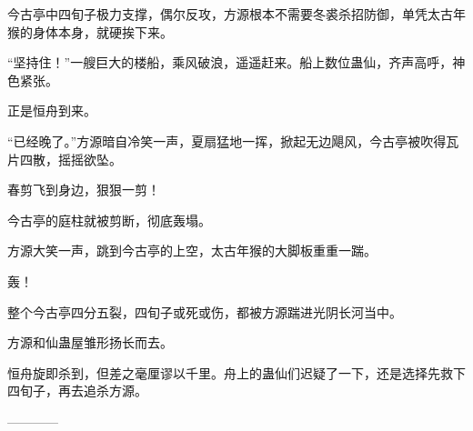 \begin{this_body}
今古亭中四旬子极力支撑，偶尔反攻，方源根本不需要冬裘杀招防御，单凭太古年猴的身体本身，就硬挨下来。

“坚持住！”一艘巨大的楼船，乘风破浪，遥遥赶来。船上数位蛊仙，齐声高呼，神色紧张。

正是恒舟到来。

“已经晚了。”方源暗自冷笑一声，夏扇猛地一挥，掀起无边飓风，今古亭被吹得瓦片四散，摇摇欲坠。

春剪飞到身边，狠狠一剪！

今古亭的庭柱就被剪断，彻底轰塌。

方源大笑一声，跳到今古亭的上空，太古年猴的大脚板重重一踹。

轰！

整个今古亭四分五裂，四旬子或死或伤，都被方源踹进光阴长河当中。

方源和仙蛊屋雏形扬长而去。

恒舟旋即杀到，但差之毫厘谬以千里。舟上的蛊仙们迟疑了一下，还是选择先救下四旬子，再去追杀方源。

------------

\end{this_body}

